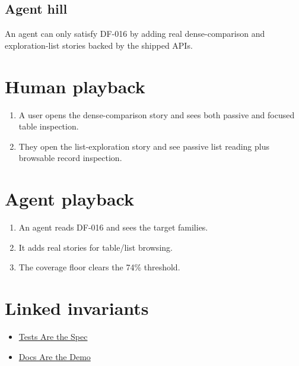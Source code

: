 \subsection{Agent hill}\label{record-078-agent-hill}

An agent can only satisfy DF-016 by adding real dense-comparison and exploration-list stories backed by the shipped APIs.

\section{Human playback}\label{record-078-human-playback}

\begin{enumerate}
\def\labelenumi{\arabic{enumi}.}
\tightlist
\item
  A user opens the dense-comparison story and sees both passive and focused table inspection.
\item
  They open the list-exploration story and see passive list reading plus browsable record inspection.
\end{enumerate}

\section{Agent playback}\label{record-078-agent-playback}

\begin{enumerate}
\def\labelenumi{\arabic{enumi}.}
\tightlist
\item
  An agent reads DF-016 and sees the target families.
\item
  It adds real stories for table/list browsing.
\item
  The coverage floor clears the 74\% threshold.
\end{enumerate}

\section{Linked invariants}\label{record-078-linked-invariants}

\begin{itemize}
\tightlist
\item
  \href{https://github.com/flyingrobots/bijou/blob/cbd70612140e7a450d764b3c7be1c6af878b99bc/docs/invariants/tests-are-the-spec.md}{Tests Are the Spec}
\item
  \href{https://github.com/flyingrobots/bijou/blob/cbd70612140e7a450d764b3c7be1c6af878b99bc/docs/invariants/docs-are-the-demo.md}{Docs Are the Demo}
\end{itemize}

